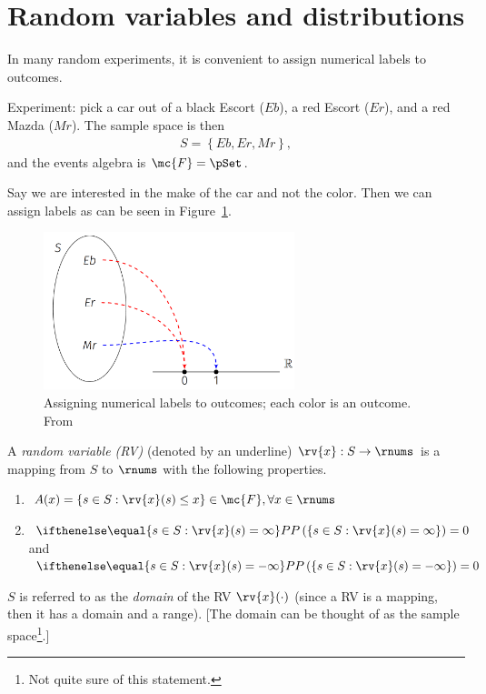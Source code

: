 \section{Random variables and distributions}
In many random experiments, it is convenient to assign numerical labels to outcomes.
\begin{example}
    Experiment: pick a car out of a black Escort ($Eb$), a red Escort ($Er$), and a red Mazda ($Mr$).
    The sample space is then 
    \begin{align}
        S = \left\{ Eb, Er, Mr\right\},
    \end{align}
    and the events algebra is $\mc{F}=\pSet$.

    Say we are interested in the make of the car and not the color. Then we can assign labels as can be seen in Figure~\ref{fig:1 assigning numerical labels to outcomes}.
    \begin{figure}[h]
        \centering
        \includegraphics[width=0.65\textwidth]{figs/1_RV_example_labels_car.PNG}    
        \caption{Assigning numerical labels to outcomes; each color is an outcome. From~\cite{psaromiligkos_slides_2019}}
        \label{fig:1 assigning numerical labels to outcomes}
    \end{figure}
\end{example}
\begin{mydefinition}
  A \emph{random variable (RV)} (denoted by an underline) $\rv{x}:S\to\rnums$ is a mapping from $S$ to $\rnums$ with the following properties.
  \begin{enumerate}
      \item $A(x) = \left\{ s\in S : \rv{x}(s)\leq x\right\}\in\mc{F}, \forall x\in\rnums$
      \item $\prob{\left\{ s\in S: \rv{x}(s)=\infty\right\}}=0$ and $\prob{\left\{ s\in S: \rv{x}(s)=-\infty\right\}}=0$
  \end{enumerate}
  $S$ is referred to as the \emph{domain} of the RV $\rv{x}(\cdot)$ (since a RV is a mapping, then it has a domain and a range). [The domain can be thought of as the sample space\footnote{Not quite sure of this statement.}.]
\end{mydefinition}
